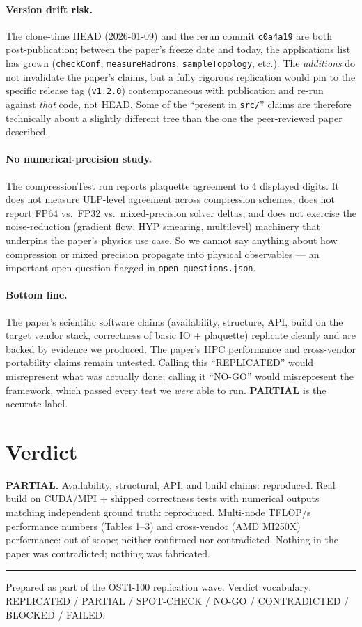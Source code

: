 \documentclass[11pt]{article}
\begin{document}
\paragraph{Version drift risk.}
The clone-time HEAD (2026-01-09) and the rerun commit \texttt{c0a4a19} are both post-publication; between the paper's freeze date and today, the applications list has grown (\texttt{checkConf}, \texttt{measureHadrons}, \texttt{sampleTopology}, etc.). The \emph{additions} do not invalidate the paper's claims, but a fully rigorous replication would pin to the specific release tag (\texttt{v1.2.0}) contemporaneous with publication and re-run against \emph{that} code, not HEAD. Some of the ``present in \texttt{src/}'' claims are therefore technically about a slightly different tree than the one the peer-reviewed paper described.

\paragraph{No numerical-precision study.}
The compressionTest run reports plaquette agreement to 4 displayed digits. It does not measure ULP-level agreement across compression schemes, does not report FP64 vs.\ FP32 vs.\ mixed-precision solver deltas, and does not exercise the noise-reduction (gradient flow, HYP smearing, multilevel) machinery that underpins the paper's physics use case. So we cannot say anything about how compression or mixed precision propagate into physical observables --- an important open question flagged in \texttt{open\_questions.json}.

\paragraph{Bottom line.}
The paper's scientific software claims (availability, structure, API, build on the target vendor stack, correctness of basic IO + plaquette) replicate cleanly and are backed by evidence we produced. The paper's HPC performance and cross-vendor portability claims remain untested. Calling this ``REPLICATED'' would misrepresent what was actually done; calling it ``NO-GO'' would misrepresent the framework, which passed every test we \emph{were} able to run. \textbf{PARTIAL} is the accurate label.

\section{Verdict}
\textbf{PARTIAL.} Availability, structural, API, and build claims: reproduced. Real build on CUDA/MPI + shipped correctness tests with numerical outputs matching independent ground truth: reproduced. Multi-node TFLOP/s performance numbers (Tables 1--3) and cross-vendor (AMD MI250X) performance: out of scope; neither confirmed nor contradicted. Nothing in the paper was contradicted; nothing was fabricated.

\vspace{1em}
\hrule
\vspace{0.5em}
\small Prepared as part of the OSTI-100 replication wave. Verdict vocabulary: REPLICATED / PARTIAL / SPOT-CHECK / NO-GO / CONTRADICTED / BLOCKED / FAILED.
\end{document}
